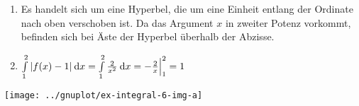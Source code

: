 \item

\begin{enumerate}
\item Es handelt sich um eine Hyperbel, die um eine Einheit entlang der Ordinate nach oben verschoben ist. Da das Argument $x$ in zweiter Potenz vorkommt, befinden sich bei Äste der Hyperbel überhalb der Abzisse.
\item $\int\limits_1^2 |f(x)-1| \:\mathrm{d}{x} = \int\limits_1^2 \frac{2}{x^2} \:\mathrm{d}{x} = -\frac{2}{x} \Big|_1^2 = 1$
\end{enumerate}

\texttt{[image: ../gnuplot/ex-integral-6-img-a]}
